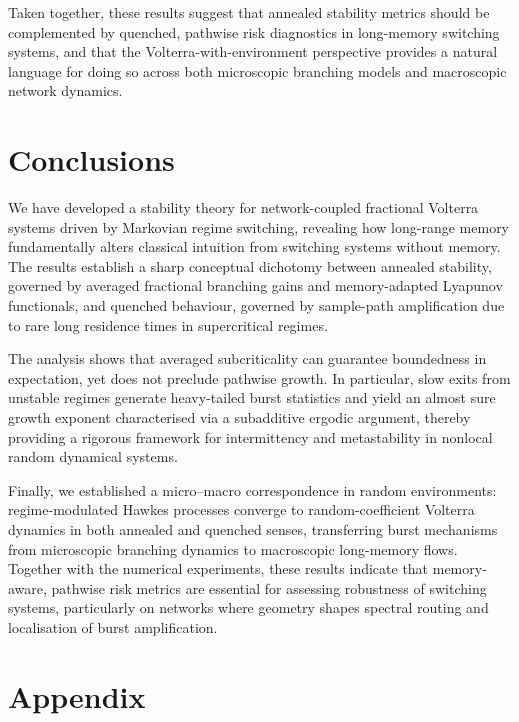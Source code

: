 \documentclass[12pt,a4paper]{article}
\theoremstyle{plain}
\theoremstyle{definition}
\theoremstyle{remark}
\begin{document}
Taken together, these results suggest that annealed stability metrics should be
complemented by quenched, pathwise risk diagnostics in long-memory switching
systems, and that the Volterra-with-environment perspective provides a natural
language for doing so across both microscopic branching models and macroscopic
network dynamics.

	\section{Conclusions}
	\label{sec:conclusions}
	
	We have developed a stability theory for network-coupled fractional Volterra
	systems driven by Markovian regime switching, revealing how long-range memory
	fundamentally alters classical intuition from switching systems without memory.
	The results establish a sharp conceptual dichotomy between annealed stability,
	governed by averaged fractional branching gains and memory-adapted Lyapunov
	functionals, and quenched behaviour, governed by sample-path amplification due to
	rare long residence times in supercritical regimes.
	
	The analysis shows that averaged subcriticality can guarantee boundedness in
	expectation, yet does not preclude pathwise growth. In particular, slow exits from
	unstable regimes generate heavy-tailed burst statistics and yield an almost sure
	growth exponent characterised via a subadditive ergodic argument, thereby providing
	a rigorous framework for intermittency and metastability in nonlocal random
	dynamical systems.
	
	Finally, we established a micro--macro correspondence in random environments:
	regime-modulated Hawkes processes converge to random-coefficient Volterra dynamics
	in both annealed and quenched senses, transferring burst mechanisms from microscopic
	branching dynamics to macroscopic long-memory flows. Together with the numerical
	experiments, these results indicate that memory-aware, pathwise risk metrics are
	essential for assessing robustness of switching systems, particularly on networks
	where geometry shapes spectral routing and localisation of burst amplification.
	
\section*{Appendix}
	\appendix
	
\end{document}
